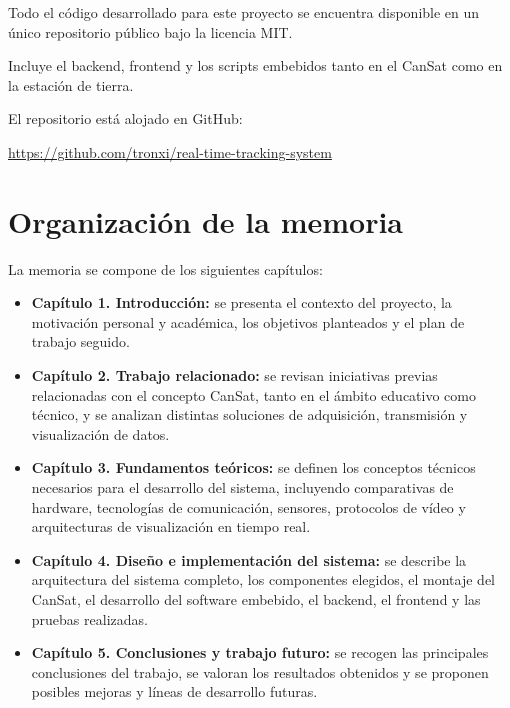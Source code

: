 Todo el código desarrollado para este proyecto se encuentra disponible en un único repositorio público bajo la licencia MIT.

Incluye el backend, frontend y los scripts embebidos tanto en el CanSat como en la estación de tierra.

El repositorio está alojado en GitHub:

\url{https://github.com/tronxi/real-time-tracking-system}


\section{Organización de la memoria}

La memoria se compone de los siguientes capítulos:

\begin{itemize}
    \item \textbf{Capítulo 1. Introducción:} se presenta el contexto del proyecto, la motivación personal y académica, los objetivos planteados y el plan de trabajo seguido.

    \item \textbf{Capítulo 2. Trabajo relacionado:} se revisan iniciativas previas relacionadas con el concepto CanSat, tanto en el ámbito educativo como técnico, y se analizan distintas soluciones de adquisición, transmisión y visualización de datos.

    \item \textbf{Capítulo 3. Fundamentos teóricos:} se definen los conceptos técnicos necesarios para el desarrollo del sistema, incluyendo comparativas de hardware, tecnologías de comunicación, sensores, protocolos de vídeo y arquitecturas de visualización en tiempo real.

    \item \textbf{Capítulo 4. Diseño e implementación del sistema:} se describe la arquitectura del sistema completo, los componentes elegidos, el montaje del CanSat, el desarrollo del software embebido, el backend, el frontend y las pruebas realizadas.

    \item \textbf{Capítulo 5. Conclusiones y trabajo futuro:} se recogen las principales conclusiones del trabajo, se valoran los resultados obtenidos y se proponen posibles mejoras y líneas de desarrollo futuras.
\end{itemize}